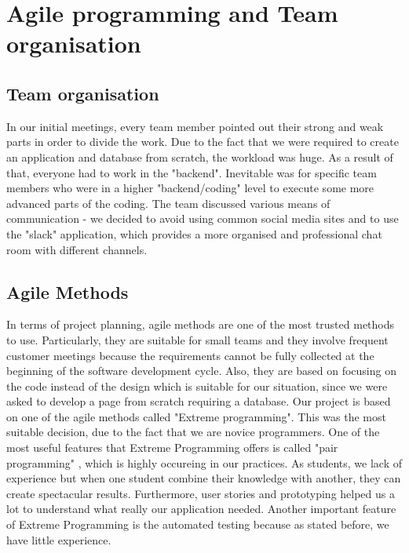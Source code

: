 \documentclass{l3proj}
\begin{document}
\section{Agile programming and Team organisation}

\subsection{Team organisation}
\label{organisation}

In our initial meetings, every team member pointed out their strong and weak parts in order to divide the work. Due to the fact that we were required to create an application and database from scratch, the workload was huge. As a result of that, everyone had to work in the "backend". Inevitable was for specific team members who were in a higher "backend/coding" level to execute some more advanced parts of the coding.
The team discussed various means of communication - we decided to avoid using common social media sites and to use the "slack" application, which provides a more organised and professional chat room with different channels. 

\subsection{Agile Methods}
\label{agile}

In terms of project planning, agile methods are one of the most trusted methods to use. Particularly, they are suitable for small teams and they involve frequent customer meetings because the requirements cannot be fully collected at the beginning of the software development cycle. Also, they are based on focusing on the code instead of the design which is suitable for our situation, since we were asked to develop a page from scratch requiring a database. Our project is based on one of the agile methods called "Extreme programming". This was the most suitable decision, due to the fact that we are novice programmers. One of the most useful features that Extreme Programming offers is called "pair programming" , which is highly occureing in our practices. As students, we lack of experience but when one student combine their knowledge with another, they can create spectacular results. Furthermore, user stories and prototyping helped us a lot to understand what really our application needed. Another important feature of Extreme Programming is the automated testing because as stated before, we have little experience.
\end{document}
